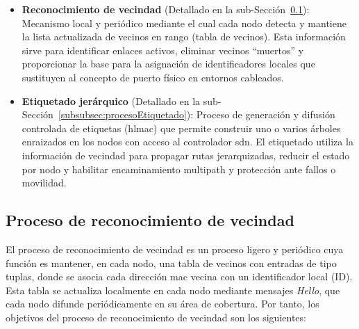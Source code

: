 \begin{itemize}

\item \textbf{Reconocimiento de vecindad} (Detallado en la sub-Sección~\ref{subsubsec:procesoVecinos}): Mecanismo local y periódico mediante el cual cada nodo detecta y mantiene la lista actualizada de vecinos en rango (tabla de vecinos). Esta información sirve para identificar enlaces activos, eliminar vecinos “muertos” y proporcionar la base para la asignación de identificadores locales que sustituyen al concepto de puerto físico en entornos cableados.

\item \textbf{Etiquetado jerárquico} (Detallado en la sub-Sección~\ref{subsubsec:procesoEtiquetado}): Proceso de generación y difusión controlada de etiquetas (\gls{hlmac}) que permite construir uno o varios árboles enraizados en los nodos con acceso al controlador \gls{sdn}. El etiquetado utiliza la información de vecindad para propagar rutas jerarquizadas, reducir el estado por nodo y habilitar encaminamiento multipath y protección ante fallos o movilidad.

\end{itemize}

\subsection{Proceso de reconocimiento de vecindad}
\label{subsubsec:procesoVecinos}

El proceso de reconocimiento de vecindad es un proceso ligero y periódico cuya función es mantener, en cada nodo, una tabla de vecinos con entradas de tipo tuplas, donde se asocia cada dirección \gls{mac} vecina con un identificador local (ID). Esta tabla se actualiza  localmente en cada nodo mediante mensajes \textit{Hello}, que cada nodo difunde periódicamente en su área de cobertura. Por tanto, los objetivos del proceso de reconocimiento de vecindad son los siguientes:

